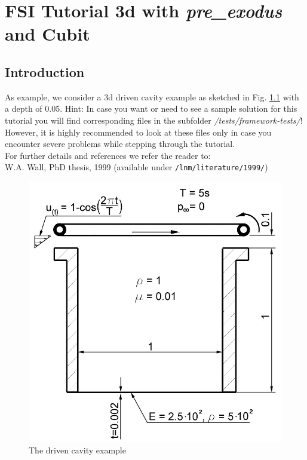\newcommand{\prexo}{\emph{pre\_exodus \,}}
\newcommand{\bc}{\emph{bc-file \,}}
\newcommand{\head}{\emph{header-file \,}}

\chapter{FSI Tutorial 3d with \prexo and Cubit}
\label{tut_fsi_preexo:chap}

\section{Introduction}

As example, we consider a 3d driven cavity example as
sketched in Fig. \ref{tut_fsi_preexo:1.1} with a depth of 0.05.
Hint: In case you want or need to see a sample solution for this tutorial 
you will find corresponding files in the \baci{} subfolder \emph{/tests/framework-tests/}!
However, it is highly recommended to look at these files only in case you encounter severe problems
while stepping through the tutorial.\\
For further details and references we refer the reader to:\\
W.A. Wall, PhD thesis, 1999
(available under \texttt{/lnm/literature/1999/})

\begin{figure}[h]
\hfil\includegraphics[scale=0.2]{Bilder/Angabeskizze}

\caption{\label{tut_fsi_preexo:1.1} The driven cavity example}
\end{figure}

